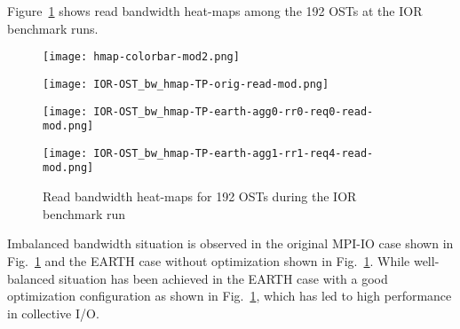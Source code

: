 \documentclass{jhps}
\begin{document}
Figure~\ref{fig:IOR_OST_BW_HMAP_RD} shows read bandwidth heat-maps
among the 192 OSTs at the IOR benchmark runs.
%
\begin{figure}[htb]
\begin{minipage}[t]{0.06\textwidth}
 \texttt{[image: hmap-colorbar-mod2.png]}
\end{minipage}
%
\noindent
\begin{minipage}[t]{0.3\textwidth}
 \centering
 \texttt{[image: IOR-OST\_bw\_hmap-TP-orig-read-mod.png]}
 \label{fig:IOR_OST_RD_ORIG}
\end{minipage}
%
\noindent
\begin{minipage}[t]{0.3\textwidth}
 \centering
 \texttt{[image: IOR-OST\_bw\_hmap-TP-earth-agg0-rr0-req0-read-mod.png]}
 \label{fig:IOR_OST_RD_AGG0_RR0_REQ0}
\end{minipage}
%
\noindent
\begin{minipage}[t]{0.3\textwidth}
 \centering
 \texttt{[image: IOR-OST\_bw\_hmap-TP-earth-agg1-rr1-req4-read-mod.png]}
 \label{fig:IOR_OST_RD_AGG1_RR1_REQ4}
\end{minipage}
%
\caption{Read bandwidth heat-maps for 192 OSTs during the IOR benchmark run}
\label{fig:IOR_OST_BW_HMAP_RD}
\end{figure}
%
Imbalanced bandwidth situation is observed in the original MPI-IO case shown in
Fig.~\ref{fig:IOR_OST_BW_HMAP_RD}
and the EARTH case without optimization shown
in Fig.~\ref{fig:IOR_OST_BW_HMAP_RD}.
While well-balanced situation has been achieved in the EARTH case
with a good optimization configuration as shown in
Fig.~\ref{fig:IOR_OST_BW_HMAP_RD},
which has led to high performance in collective I/O.
\end{document}
